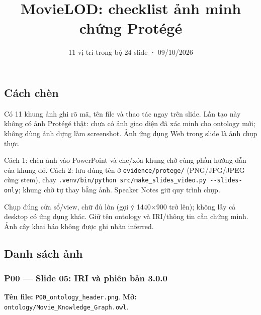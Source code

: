 \documentclass[
  11pt,
]{article}
\title{MovieLOD: checklist ảnh minh chứng Protégé}
\author{}
\date{11 vị trí trong bộ 24 slide · 09/10/2026}
\begin{document}
\maketitle

\subsection{Cách chèn}\label{cuxe1ch-chuxe8n}

Có 11 khung ảnh ghi rõ mã, tên file và thao tác ngay trên slide. Lần tạo
này không có ảnh Protégé thật: chưa có ảnh giao diện đã xác minh cho
ontology mới; không dùng ảnh dựng làm screenshot. Ảnh ứng dụng Web trong
slide là ảnh chụp thực.

Cách 1: chèn ảnh vào PowerPoint và che/xóa khung chờ cùng phần hướng dẫn
của khung đó. Cách 2: lưu đúng tên ở
\texttt{evidence\allowbreak{}/\allowbreak{}protege\allowbreak{}/\allowbreak{}}
(\allowbreak{}P\allowbreak{}N\allowbreak{}G/\allowbreak{}\allowbreak{}J\allowbreak{}P\allowbreak{}G\allowbreak{}/\allowbreak{}\allowbreak{}J\allowbreak{}P\allowbreak{}E\allowbreak{}G
cùng stem), chạy
\texttt{.\allowbreak{}venv/\allowbreak{}bi\allowbreak{}n/\allowbreak{}python\allowbreak{} src/\allowbreak{}mak\allowbreak{}e\_\allowbreak{}slides\allowbreak{}\_\allowbreak{}video.\allowbreak{}p\allowbreak{}y -\allowbreak{}-\allowbreak{}slid\allowbreak{}es-\allowbreak{}only};
khung chờ tự thay bằng ảnh. Speaker Notes giữ quy trình chụp.

Chụp đúng cửa sổ/view, chữ đủ lớn (gợi ý 1440×900 trở lên); không lấy cả
desktop có ứng dụng khác. Giữ tên ontology và IRI/thông tin cần chứng
minh. Ảnh cây khai báo không được ghi nhãn inferred.

\subsection{Danh sách ảnh}\label{danh-suxe1ch-ux1ea3nh}

\subsubsection{P00 --- Slide 05: IRI và phiên bản
3.0.0}\label{p00-slide-05-iri-vuxe0-phiuxean-bux1ea3n-3.0.0}

\textbf{Tên file:}
\texttt{P00\_\allowbreak{}onto\allowbreak{}logy\_\allowbreak{}hea\allowbreak{}der.\allowbreak{}png}.
\textbf{Mở:}
\texttt{ontology\allowbreak{}/\allowbreak{}\allowbreak{}Movie\_\allowbreak{}\allowbreak{}K\allowbreak{}nowledge\allowbreak{}\_\allowbreak{}\allowbreak{}Graph.\allowbreak{}o\allowbreak{}wl}.
\end{document}
